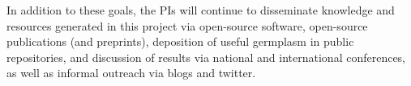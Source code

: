 In addition to these goals, the PIs will continue to disseminate knowledge and resources generated in this project via open-source software, open-source publications (and preprints), deposition of useful germplasm in public repositories, and discussion of results via national and international conferences, as well as informal outreach via blogs and twitter.


